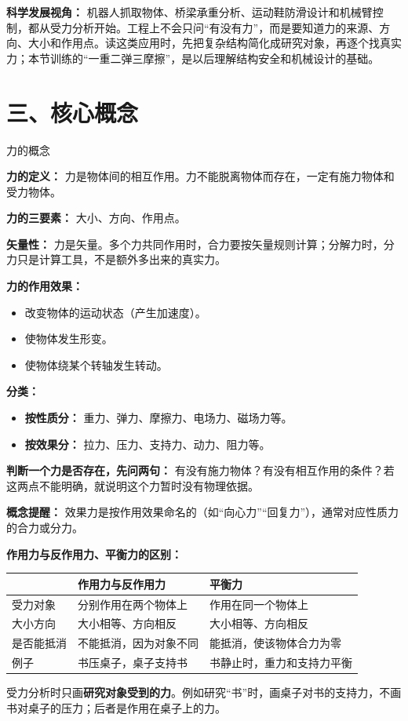 \textbf{科学发展视角：} 机器人抓取物体、桥梁承重分析、运动鞋防滑设计和机械臂控制，都从受力分析开始。工程上不会只问“有没有力”，而是要知道力的来源、方向、大小和作用点。读这类应用时，先把复杂结构简化成研究对象，再逐个找真实力；本节训练的“一重二弹三摩擦”，是以后理解结构安全和机械设计的基础。

\section*{三、核心概念}
\nopagebreak[4]

\begin{conceptbox}{力的概念}

\textbf{力的定义：} 力是物体间的相互作用。力不能脱离物体而存在，一定有施力物体和受力物体。

\textbf{力的三要素：} 大小、方向、作用点。

\textbf{矢量性：} 力是矢量。多个力共同作用时，合力要按矢量规则计算；分解力时，分力只是计算工具，不是额外多出来的真实力。

\textbf{力的作用效果：}
\begin{itemize}
  \item 改变物体的运动状态（产生加速度）。
  \item 使物体发生形变。
  \item 使物体绕某个转轴发生转动。
\end{itemize}

\textbf{分类：}
\begin{itemize}
  \item \textbf{按性质分：} 重力、弹力、摩擦力、电场力、磁场力等。
  \item \textbf{按效果分：} 拉力、压力、支持力、动力、阻力等。
\end{itemize}

\textbf{判断一个力是否存在，先问两句：} 有没有施力物体？有没有相互作用的条件？若这两点不能明确，就说明这个力暂时没有物理依据。

\textbf{概念提醒：} 效果力是按作用效果命名的（如“向心力”“回复力”），通常对应性质力的合力或分力。

\vspace{0.5em}
\textbf{作用力与反作用力、平衡力的区别：}

\begin{center}
\begin{tabular}{p{}p{}p{}}
\toprule
 & 作用力与反作用力 & 平衡力 \\
\midrule
受力对象 & 分别作用在两个物体上 & 作用在同一个物体上 \\
大小方向 & 大小相等、方向相反 & 大小相等、方向相反 \\
是否能抵消 & 不能抵消，因为对象不同 & 能抵消，使该物体合力为零 \\
例子 & 书压桌子，桌子支持书 & 书静止时，重力和支持力平衡 \\
\bottomrule
\end{tabular}
\end{center}

受力分析时只画\textbf{研究对象受到的力}。例如研究“书”时，画桌子对书的支持力，不画书对桌子的压力；后者是作用在桌子上的力。

\end{conceptbox}

